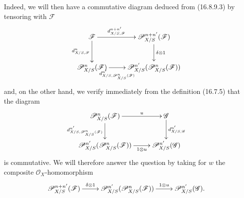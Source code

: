 Indeed, we will then have a commutative diagram deduced from (16.8.9.3) by
tensoring with $\mathscr{F}$
\[
  \xymatrix{
    \mathscr{F}\ar[r]^-{d_{X/S,\mathscr{F}}^{n+n'}}
      \ar[d]_-{d_{X/S,\mathscr{F}}^n}
      &\mathscr{P}_{X/S}^{n+n'}(\mathscr{F})
        \ar[d]^-{\delta\otimes1}\\
    \mathscr{P}_{X/S}^n(\mathscr{F})
      \ar[r]_-{d_{X/S,\mathscr{P}_{X/S}^n(\mathscr{F})}^{n'}}
      &\mathscr{P}_{X/S}^{n'}(\mathscr{P}_{X/S}^n(\mathscr{F}))
  }
\]
and, on the other hand, we verify immediately from the definition (16.7.5)
that the diagram
\[
  \xymatrix{
    \mathscr{P}_{X/S}^n(\mathscr{F})\ar[r]^-u
      \ar[d]_-{d_{X/S,\mathscr{P}_{X/S}^n(\mathscr{F})}^{n'}}
      &\mathscr{G}\ar[d]^-{d_{X/S,\mathscr{G}}^{n'}}\\
    \mathscr{P}_{X/S}^{n'}(\mathscr{P}_{X/S}^n(\mathscr{F}))
      \ar[r]_-{1\otimes u}
      &\mathscr{P}_{X/S}^{n'}(\mathscr{G})
  }
\]
is commutative. We will therefore answer the question by taking for $w$ the
composite $\mathcal{O}_X$-homomorphism
\[
  \xymatrix{
    \mathscr{P}_{X/S}^{n+n'}(\mathscr{F})
      \ar[r]^-{\delta\otimes1}
      &\mathscr{P}_{X/S}^{n'}(\mathscr{P}_{X/S}^n(\mathscr{F}))
        \ar[r]^-{1\otimes u}
      &\mathscr{P}_{X/S}^{n'}(\mathscr{G}).
  }
\]

